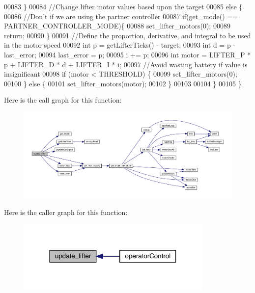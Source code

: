 \begin{DoxyCode}
00083   \}
00084   \textcolor{comment}{//Change lifter motor values based upon the target}
00085   \textcolor{keywordflow}{else} \{
00086     \textcolor{comment}{//Don't if we are using the partner controller}
00087     \textcolor{keywordflow}{if}(get_mode() == PARTNER_CONTROLLER_MODE)\{
00088       set_lifter_motors(0);
00089       \textcolor{keywordflow}{return};
00090     \}
00091     \textcolor{comment}{//Define the proportion, derivative, and integral to be used in the motor speed}
00092     \textcolor{keywordtype}{int} p = getLifterTicks() - target;
00093     \textcolor{keywordtype}{int} d = p - last\_error;
00094     last\_error = p;
00095     i += p;
00096     \textcolor{keywordtype}{int} motor = LIFTER_P * p + LIFTER_D * d + LIFTER_I * i;
00097     \textcolor{comment}{//Avoid wasting battery if value is insignificant}
00098     \textcolor{keywordflow}{if} (motor < THRESHOLD) \{
00099         set_lifter_motors(0);
00100     \} \textcolor{keywordflow}{else} \{
00101         set_lifter_motors(motor);
00102     \}
00103 
00104   \}
00105 \}
\end{DoxyCode}
Here is the call graph for this function\+:\nopagebreak
\begin{figure}[H]
\begin{center}
\leavevmode
\includegraphics[width=350pt]{lifter_8c_a59bb7413777ca16aba124aaedf95c79b_cgraph}
\end{center}
\end{figure}
Here is the caller graph for this function\+:\nopagebreak
\begin{figure}[H]
\begin{center}
\leavevmode
\includegraphics[width=273pt]{lifter_8c_a59bb7413777ca16aba124aaedf95c79b_icgraph}
\end{center}
\end{figure}

